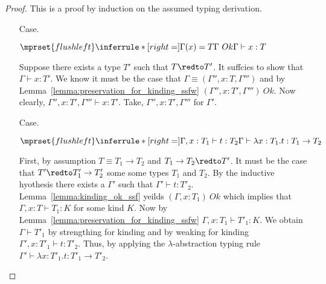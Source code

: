 \begin{proof}
  This is a proof by induction on the assumed typing derivation.

\begin{itemize}
\item[Case.]\ \\
  \begin{center}
    \begin{math}
      $$\mprset{flushleft}
      \inferrule* [right=] {
        \Gamma(x) = T
        \\
        \Gamma\ Ok
      }{\Gamma \vdash x : T}
    \end{math}  
  \end{center}
  Suppose there exists a type $T'$ such that $T \redto T'$.  It suffcies to show that
  $\Gamma \vdash x:T'$.  We know it must be the case that $\Gamma \equiv (\Gamma'',x:T,\Gamma''')$
  and by Lemma~\ref{lemma:preservation_for_kinding_ssfw} $(\Gamma'',x:T',\Gamma''')\ Ok$.  Now clearly,
  $\Gamma'',x:T',\Gamma''' \vdash x:T'$.  Take, $\Gamma'',x:T',\Gamma'''$ for $\Gamma'$. 

\item[Case.]\ \\
  \begin{center}
    \begin{math}
      $$\mprset{flushleft}
      \inferrule* [right=] {
        \Gamma,x : T_1 \vdash t : T_2
      }{\Gamma \vdash \lambda x : T_1.t : T_1 \rightarrow T_2}
    \end{math} 
  \end{center}
  First, by assumption $T \equiv T_1 \to T_2$ and $T_1 \to
  T_2 \redto T'$.  It must be the case that $T' \redto
  T'_1 \to T'_2$ some some types $T_1$ and $T_2$.  By the
  inductive hyothesis there exists a $\Gamma'$ such that $\Gamma'
  \vdash t:T'_2$. Lemma~\ref{lemma:kinding_ok_ssf} yeilds $(\Gamma,x:T_1)\ Ok$ which
  implies that $\Gamma,x:T \vdash T_1:K$ for some kind $K$.  Now
  by Lemma~\ref{lemma:preservation_for_kinding_ssfw} $\Gamma,x:T_1 \vdash
  T'_1:K$.  We obtain $\Gamma \vdash T'_1$ by strengthing for
  kinding and by weaking for kinding $\Gamma',x:T'_1 \vdash
  t:T'_2$.  Thus, by applying the $\lambda$-abstraction typing rule
  $\Gamma' \vdash \lambda x:T'_1.t:T'_1 \to T'_2$.


\end{itemize}
\end{proof}
